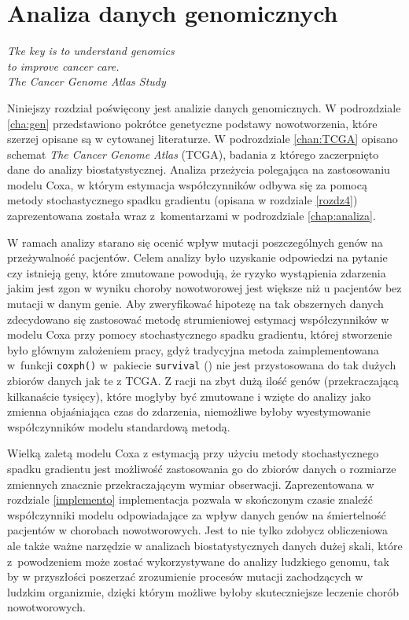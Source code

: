\chapter{Analiza danych genomicznych}\label{chap5}
\begin{flushright}
\textit{Tke key is to understand genomics \\
to improve cancer care. \\
The Cancer Genome Atlas Study
}
\end{flushright}

Niniejszy rozdział poświęcony jest analizie danych genomicznych. W podrozdziale \ref{cha:gen} przedstawiono pokrótce genetyczne podstawy nowotworzenia, które szerzej opisane są w cytowanej literaturze. W podrozdziale \ref{chan:TCGA} opisano schemat \textit{The Cancer Genome Atlas} (TCGA), badania z którego zaczerpnięto dane do analizy biostatystycznej. Analiza przeżycia polegająca na zastosowaniu modelu Coxa, w którym estymacja współczynników odbywa się za pomocą metody stochastycznego spadku gradientu (opisana w rozdziale \ref{rozdz4}) zaprezentowana została wraz z~komentarzami w podrozdziale \ref{chap:analiza}. 

W ramach analizy starano się ocenić wpływ mutacji poszczególnych genów na przeżywalność pacjentów. Celem analizy było uzyskanie odpowiedzi na pytanie czy istnieją geny, które zmutowane powodują, że ryzyko wystąpienia zdarzenia jakim jest zgon w wyniku choroby nowotworowej jest większe niż u pacjentów bez mutacji w danym genie. Aby zweryfikować hipotezę na tak obszernych danych zdecydowano się zastosować metodę strumieniowej estymacj współczynników w modelu Coxa przy pomocy stochastycznego spadku gradientu, której stworzenie było głównym założeniem pracy, gdyż tradycyjna metoda zaimplementowana w~funkcji \texttt{coxph()} w~pakiecie \texttt{survival} (\cite{survival}) nie jest przystosowana do tak dużych zbiorów danych jak te z TCGA. Z racji na zbyt dużą ilość genów (przekraczającą kilkanaście tysięcy), które mogłyby być zmutowane i wzięte do analizy jako zmienna objaśniająca czas do zdarzenia, niemożliwe byłoby wyestymowanie współczynników modelu standardową metodą.

Wielką zaletą modelu Coxa z estymacją przy użyciu metody stochastycznego spadku gradientu jest możliwość zastosowania go do zbiorów danych o rozmiarze zmiennych znacznie przekraczającym wymiar obserwacji. Zaprezentowana w rozdziale \ref{implemento} implementacja pozwala w skończonym czasie znaleźć współczynniki modelu odpowiadające za wpływ danych genów na śmiertelność pacjentów w chorobach nowotworowych. Jest to nie tylko zdobycz obliczeniowa ale także ważne narzędzie w analizach biostatystycznych danych dużej skali, które z~powodzeniem może zostać wykorzystywane do analizy ludzkiego genomu, tak by w przyszłości poszerzać zrozumienie procesów mutacji zachodzących w ludzkim organizmie, dzięki którym możliwe byłoby skuteczniejsze leczenie chorób nowotworowych.
\newpage
